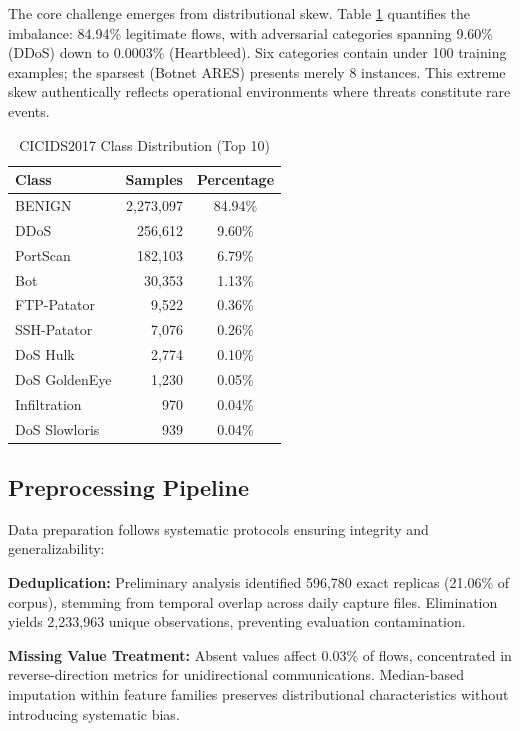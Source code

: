 \documentclass[10pt,twocolumn]{article}
\begin{document}
The core challenge emerges from distributional skew. Table \ref{tab:distribution} quantifies the imbalance: 84.94\% legitimate flows, with adversarial categories spanning 9.60\% (DDoS) down to 0.0003\% (Heartbleed). Six categories contain under 100 training examples; the sparsest (Botnet ARES) presents merely 8 instances. This extreme skew authentically reflects operational environments where threats constitute rare events.

\begin{table}[htbp]
\caption{CICIDS2017 Class Distribution (Top 10)}
\label{tab:distribution}
\centering
\small
\begin{tabular}{lrc}
\toprule
\textbf{Class} & \textbf{Samples} & \textbf{Percentage} \\
\midrule
BENIGN & 2,273,097 & 84.94\% \\
DDoS & 256,612 & 9.60\% \\
PortScan & 182,103 & 6.79\% \\
Bot & 30,353 & 1.13\% \\
FTP-Patator & 9,522 & 0.36\% \\
SSH-Patator & 7,076 & 0.26\% \\
DoS Hulk & 2,774 & 0.10\% \\
DoS GoldenEye & 1,230 & 0.05\% \\
Infiltration & 970 & 0.04\% \\
DoS Slowloris & 939 & 0.04\% \\
\bottomrule
\end{tabular}
\end{table}

\subsection{Preprocessing Pipeline}

Data preparation follows systematic protocols ensuring integrity and generalizability:

\textbf{Deduplication:} Preliminary analysis identified 596,780 exact replicas (21.06\% of corpus), stemming from temporal overlap across daily capture files. Elimination yields 2,233,963 unique observations, preventing evaluation contamination.

\textbf{Missing Value Treatment:} Absent values affect 0.03\% of flows, concentrated in reverse-direction metrics for unidirectional communications. Median-based imputation within feature families preserves distributional characteristics without introducing systematic bias.
\end{document}
